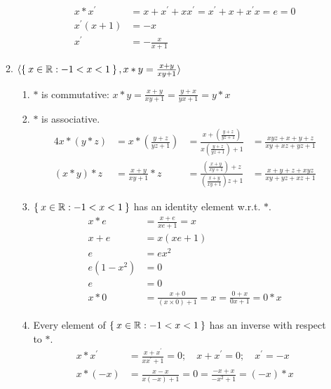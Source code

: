 \begin{enumerate}[label={\Alph*.},font={\bfseries}]
\begin{enumerate}[label={\arabic*},font={\bfseries}]
\begin{enumerate}[label={(\roman*)}]
            \begin{align*}
              x*x^\prime &= x+x^\prime+xx^\prime=x^\prime+x+x^{\prime}x = e = 0 \\
              x^{\prime}(x+1) &= -x \\
              x^\prime &= -\frac{x}{x+1}
            \end{align*}
        \end{enumerate}
      \item $\langle\Set{x\in\mathbb{R} :-1 < x < 1}, x*y=\frac{x+y}{xy+1}\rangle$
        \begin{enumerate}[label={(\roman*)}]
          \item $*$ is commutative: $x*y=\frac{x+y}{xy+1}=\frac{y+x}{yx+1}=y*x$
          \item $*$ is associative.
            \begin{alignat*}{4}
              x*(y*z) &= x*(\frac{y+z}{yz+1})
              &= \frac{x+(\frac{y+z}{yz+1})}{x(\frac{y+z}{yz+1})+1}
              &= \frac{xyz+x+y+z}{xy+xz+yz+1} \\
              (x*y)*z &= \frac{x+y}{xy+1}*z
              &= \frac{(\frac{x+y}{xy+1})+z}{(\frac{x+y}{xy+1})z+1}
              &= \frac{x+y+z+xyz}{xy+yz+xz+1}
            \end{alignat*}
          \item $\Set{x\in\mathbb{R} : -1 < x < 1}$ has an identity element w.r.t. $*$.
            \begin{align*}
              x*e &= \frac{x+e}{xe+1} = x \\
              x+e &= x(xe+1) \\
              e &= ex^2 \\
              e(1-x^2) &= 0 \\
              e &= 0 \\
              x*0 &= \frac{x+0}{(x\times0)+1} = x = \frac{0+x}{0x+1} = 0*x
            \end{align*}
          \item Every element of $\Set{x\in\mathbb{R} : -1 < x < 1}$ has an inverse with respect to $*$.
            \begin{align*}
              x * x^\prime &= \frac{x+x^\prime}{xx^\prime+1} = 0; \quad
              x+x^\prime = 0; \quad
              x^\prime = -x \\
              x*(-x) &= \frac{x-x}{x(-x)+1} = 0 = \frac{-x+x}{-x^2+1} = (-x)*x
            \end{align*}
        \end{enumerate}
    \end{enumerate}
\end{enumerate}
